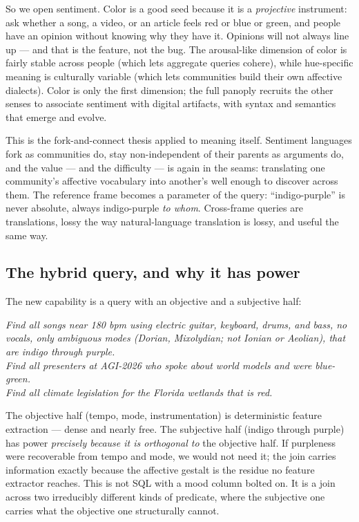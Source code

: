 \documentclass[11pt]{article}
\begin{document}
So we open sentiment. Color is a good seed because it is a \emph{projective} instrument: ask whether a song, a video, or an article feels red or blue or green, and people have an opinion without knowing why they have it. Opinions will not always line up --- and that is the feature, not the bug. The arousal-like dimension of color is fairly stable across people (which lets aggregate queries cohere), while hue-specific meaning is culturally variable (which lets communities build their own affective dialects). Color is only the first dimension; the full panoply recruits the other senses to associate sentiment with digital artifacts, with syntax and semantics that emerge and evolve.

This is the fork-and-connect thesis applied to meaning itself. Sentiment languages fork as communities do, stay non-independent of their parents as arguments do, and the value --- and the difficulty --- is again in the seams: translating one community's affective vocabulary into another's well enough to discover across them. The reference frame becomes a parameter of the query: ``indigo-purple'' is never absolute, always indigo-purple \emph{to whom}. Cross-frame queries are translations, lossy the way natural-language translation is lossy, and useful the same way.

\subsection*{The hybrid query, and why it has power}

The new capability is a query with an objective and a subjective half:

\begin{keybox}
\emph{Find all songs near 180 bpm using electric guitar, keyboard, drums, and bass, no vocals, only ambiguous modes (Dorian, Mixolydian; not Ionian or Aeolian), that are indigo through purple.}\\[4pt]
\emph{Find all presenters at AGI-2026 who spoke about world models and were blue-green.}\\[4pt]
\emph{Find all climate legislation for the Florida wetlands that is red.}
\end{keybox}

The objective half (tempo, mode, instrumentation) is deterministic feature extraction --- dense and nearly free. The subjective half (indigo through purple) has power \emph{precisely because it is orthogonal to} the objective half. If purpleness were recoverable from tempo and mode, we would not need it; the join carries information exactly because the affective gestalt is the residue no feature extractor reaches. This is not SQL with a mood column bolted on. It is a join across two irreducibly different kinds of predicate, where the subjective one carries what the objective one structurally cannot.
\end{document}
